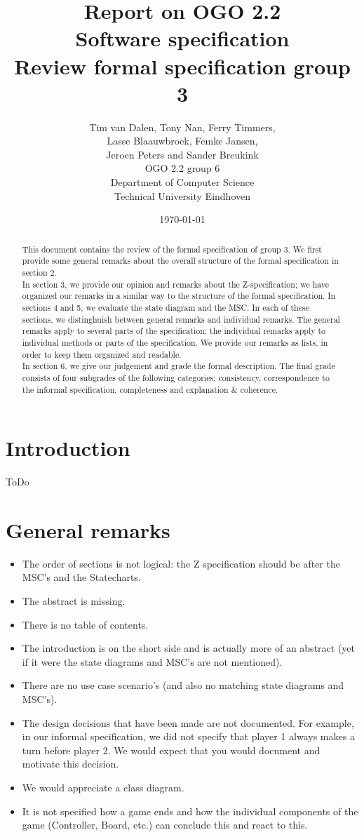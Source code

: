 \documentclass[a4paper,11pt]{article}
\title{Report on OGO 2.2 \\ Software specification\\ Review formal specification group 3}
\author{
        Tim van Dalen, Tony Nan, Ferry Timmers, \\ Lasse Blaauwbroek, Femke Jansen, \\Jeroen Peters and Sander Breukink\\ OGO 2.2 group 6 \\
                Department of Computer Science\\
        Technical University Eindhoven\\
}
\date{\today}
\begin{document}
\maketitle

\begin{abstract}
This document contains the review of the formal specification of group 3. We first provide some general remarks about the overall structure of the formal specification in section 2. \\
In section 3, we provide our opinion and remarks about the Z-specification; we have organized our remarks in a similar way to the structure of the formal specification. In sections 4 and 5, we evaluate the state diagram and the MSC. In each of these sections, we distinghuish between general remarks and individual remarks. The general remarks apply to several parts of the specification; the individual remarks apply to individual methods or parts of the specification. We provide our remarks as lists, in order to keep them organized and readable. \\
In section 6, we give our judgement and grade the formal description. The final grade consists of four subgrades of the following categories: consistency, correspondence to the informal specification, completeness and explanation \& coherence.
\end{abstract}

\newpage
	
	\tableofcontents
	\newpage

    \section{Introduction}
    ToDo	

	\section{General remarks}
    \begin{itemize}
        \item The order of sections is not logical: the Z specification should be after the MSC's and the Statecharts.
        \item The abstract is missing.
        \item There is no table of contents.
        \item The introduction is on the short side and is actually more of an abstract (yet if it were the state diagrams and MSC's are not mentioned).
        \item There are no use case scenario's (and also no matching state diagrams and MSC's).
        \item The design decisions that have been made are not documented. For example, in our informal specification, we did not specify that player 1 always makes a turn before player 2. We would expect that you would document and motivate this decision.
        \item We would appreciate a class diagram.
        \item It is not specified how a game ends and how the individual components of the game (Controller, Board, etc.) can conclude this and react to this.
    \end{itemize}
	
\end{document}
